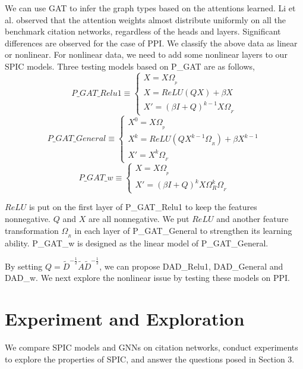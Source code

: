 \documentclass[preprint,11pt]{elsarticle}
\begin{document}
We can use GAT to infer the graph types based on the attentions learned. Li et al.  \cite{ref25} observed that the attention weights almost distribute uniformly on all the benchmark citation networks, regardless of the heads and layers. Significant differences are observed for the case of PPI. We classify the above data as linear or nonlinear. For nonlinear data, we need to add some nonlinear layers to our SPIC models. Three testing models based on P\_GAT are as follows,
\begin{equation}
P\_GAT\_Relu1 \equiv
\left\{ 
\begin{array}{l}
X = X\Omega_{_p}\\
X = ReLU(QX) + \beta X \\
X' = (\beta I + Q)^{k-1} X\Omega_{_F}
\end{array}
\right.
\end{equation}
\begin{equation}
P\_GAT\_General \equiv
\left\{ 
\begin{array}{l}
X^{0} = X\Omega_{_p}\\
X^{k} = ReLU(QX^{k-1}\Omega_{_R})+\beta X^{k-1}\\
X' = X^k \Omega_{_F}
\end{array}
\right.
\end{equation}
\begin{equation}
P\_GAT\_w \equiv
\left\{ 
\begin{array}{l}
X = X\Omega_{_p} \\
X' = (\beta I +Q)^k X \Omega_{R}^{k} \Omega_{_F}
\end{array}
\right.
\end{equation}

$ReLU$ is put on the first layer of P\_GAT\_Relu1 to keep the features nonnegative. $Q$ and $X$ are all nonnegative. We put $ReLU$ and another feature transformation $\Omega_{_R}$ in each layer of P\_GAT\_General to strengthen its learning ability. P\_GAT\_w is designed as the linear model of P\_GAT\_General.

By setting $Q = \widetilde{D}^{-\frac{1}{2}}\widetilde{A} \widetilde{D}^{-\frac{1}{2}}$, we can propose DAD\_Relu1, DAD\_General and DAD\_w. We next explore the nonlinear issue by testing these models on PPI.

\section{ Experiment and Exploration}

We compare SPIC models and GNNs on citation networks, conduct experiments to explore the properties of SPIC, and answer the questions posed in Section 3.
\end{document}
